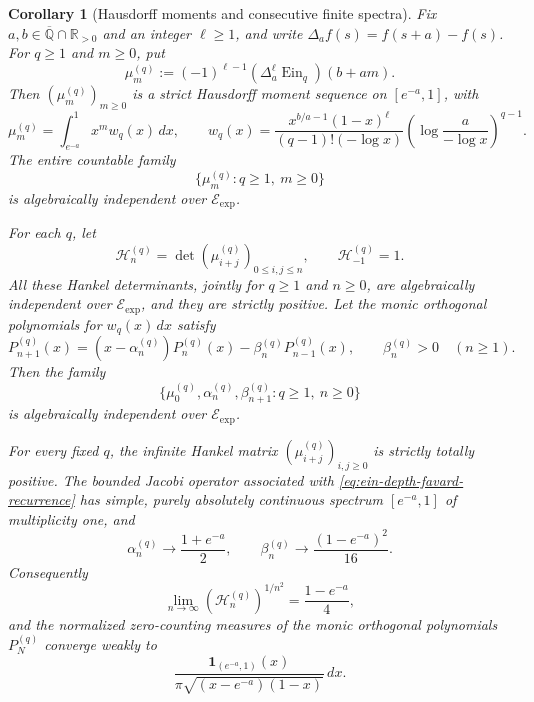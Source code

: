 \documentclass[11pt]{article}
\newtheorem{corollary}[theorem]{Corollary}
\theoremstyle{definition}
\theoremstyle{remark}
\newcommand{\Qbar}{\overline{\mathbb Q}}
\newcommand{\EinDepth}[1]{\operatorname{Ein}_{#1}}
\newcommand{\Eexp}{\mathcal E_{\mathrm{exp}}}
\begin{document}
\begin{corollary}[Hausdorff moments and consecutive finite spectra]
\label{cor:ein-depth-hausdorff-spectra}
Fix \(a,b\in\Qbar\cap\mathbb R_{>0}\) and an integer \(\ell\geq1\), and
write \(\Delta_a f(s)=f(s+a)-f(s)\).  For \(q\geq1\) and \(m\geq0\), put
\begin{equation}\label{eq:ein-depth-finite-difference-moments}
 \mu_m^{(q)}
 :=(-1)^{\ell-1}(\Delta_a^\ell\EinDepth{q})(b+am).
\end{equation}
Then \((\mu_m^{(q)})_{m\geq0}\) is a strict Hausdorff moment sequence on
\([e^{-a},1]\), with
\begin{equation}\label{eq:ein-depth-hausdorff-density}
 \mu_m^{(q)}=\int_{e^{-a}}^1x^m w_q(x)\,dx,
 \qquad
 w_q(x)=
 \frac{x^{b/a-1}(1-x)^\ell}{(q-1)!(-\log x)}
 \left(\log\frac{a}{-\log x}\right)^{q-1}.
\end{equation}
The entire countable family
\begin{equation}\label{eq:ein-depth-all-moments-independent}
 \{\mu_m^{(q)}:q\geq1,\ m\geq0\}
\end{equation}
is algebraically independent over \(\Eexp\).

For each \(q\), let
\[
 \mathcal H_n^{(q)}
  =\det(\mu_{i+j}^{(q)})_{0\leq i,j\leq n},
 \qquad \mathcal H_{-1}^{(q)}=1.
\]
All these Hankel determinants, jointly for \(q\geq1\) and \(n\geq0\),
are algebraically independent over \(\Eexp\), and they are strictly
positive.  Let the monic orthogonal polynomials for \(w_q(x)\,dx\) satisfy
\begin{equation}\label{eq:ein-depth-favard-recurrence}
 P_{n+1}^{(q)}(x)
 =(x-\alpha_n^{(q)})P_n^{(q)}(x)
  -\beta_n^{(q)}P_{n-1}^{(q)}(x),
 \qquad \beta_n^{(q)}>0\quad(n\geq1).
\end{equation}
Then the family
\begin{equation}\label{eq:ein-depth-favard-independent}
 \{\mu_0^{(q)},\alpha_n^{(q)},\beta_{n+1}^{(q)}:
        q\geq1,\ n\geq0\}
\end{equation}
is algebraically independent over \(\Eexp\).

For every fixed \(q\), the infinite Hankel matrix
\((\mu_{i+j}^{(q)})_{i,j\geq0}\) is strictly totally positive.  The
bounded Jacobi operator associated with
\eqref{eq:ein-depth-favard-recurrence} has simple, purely absolutely
continuous spectrum \([e^{-a},1]\) of multiplicity one, and
\begin{equation}\label{eq:ein-depth-nevai-limits}
 \alpha_n^{(q)}\longrightarrow\frac{1+e^{-a}}2,
 \qquad
 \beta_n^{(q)}\longrightarrow\frac{(1-e^{-a})^2}{16}.
\end{equation}
Consequently
\begin{equation}\label{eq:ein-depth-hankel-capacity}
 \lim_{n\to\infty}(\mathcal H_n^{(q)})^{1/n^2}
 =\frac{1-e^{-a}}4,
\end{equation}
and the normalized zero-counting measures of the monic orthogonal
polynomials \(P_N^{(q)}\) converge weakly to
\begin{equation}\label{eq:ein-depth-arcsine-law}
 \frac{\mathbf 1_{(e^{-a},1)}(x)}
 {\pi\sqrt{(x-e^{-a})(1-x)}}\,dx.
\end{equation}


\end{corollary}
\end{document}
